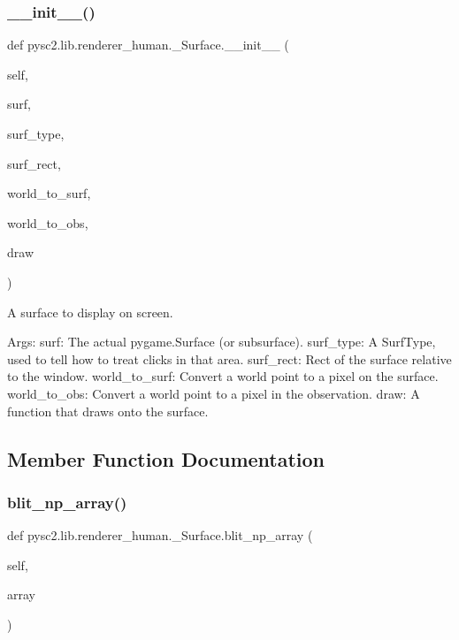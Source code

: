\subsubsection{\texorpdfstring{\+\_\+\+\_\+init\+\_\+\+\_\+()}{\_\_init\_\_()}}
{\footnotesize\ttfamily def pysc2.\+lib.\+renderer\+\_\+human.\+\_\+\+Surface.\+\_\+\+\_\+init\+\_\+\+\_\+ (\begin{DoxyParamCaption}\item[{}]{self,  }\item[{}]{surf,  }\item[{}]{surf\+\_\+type,  }\item[{}]{surf\+\_\+rect,  }\item[{}]{world\+\_\+to\+\_\+surf,  }\item[{}]{world\+\_\+to\+\_\+obs,  }\item[{}]{draw }\end{DoxyParamCaption})}

\begin{DoxyVerb}A surface to display on screen.

Args:
  surf: The actual pygame.Surface (or subsurface).
  surf_type: A SurfType, used to tell how to treat clicks in that area.
  surf_rect: Rect of the surface relative to the window.
  world_to_surf: Convert a world point to a pixel on the surface.
  world_to_obs: Convert a world point to a pixel in the observation.
  draw: A function that draws onto the surface.
\end{DoxyVerb}
 

\subsection{Member Function Documentation}
\mbox{\label{classpysc2_1_1lib_1_1renderer__human_1_1___surface_a586834302ec3b26934da8b2d5b3734f6}} 
\subsubsection{\texorpdfstring{blit\+\_\+np\+\_\+array()}{blit\_np\_array()}}
{\footnotesize\ttfamily def pysc2.\+lib.\+renderer\+\_\+human.\+\_\+\+Surface.\+blit\+\_\+np\+\_\+array (\begin{DoxyParamCaption}\item[{}]{self,  }\item[{}]{array }\end{DoxyParamCaption})}

